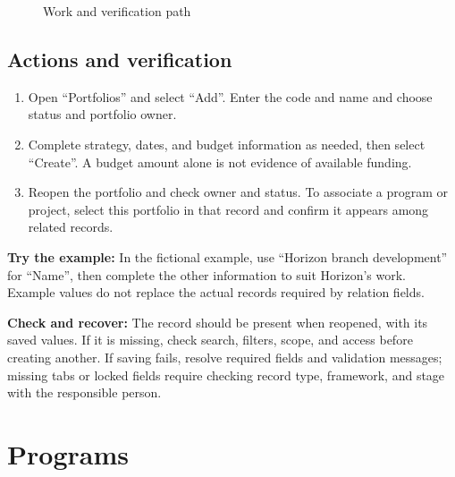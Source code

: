 \begin{figure}[H]
\centering
{}
\rclegend
\caption{Work and verification path}
\label{fig:projects-portfolios-flow}
\end{figure}

\subsection{Actions and verification}
\begin{enumerate}
\item Open “Portfolios” and select “Add”. Enter the code and name and choose status and portfolio owner.
\item Complete strategy, dates, and budget information as needed, then select “Create”. A budget amount alone is not evidence of available funding.
\item Reopen the portfolio and check owner and status. To associate a program or project, select this portfolio in that record and confirm it appears among related records.
\end{enumerate}

\textbf{Try the example:} In the fictional example, use “Horizon branch development” for “Name”, then complete the other information to suit Horizon's work. Example values do not replace the actual records required by relation fields.

\textbf{Check and recover:} The record should be present when reopened, with its saved values. If it is missing, check search, filters, scope, and access before creating another. If saving fails, resolve required fields and validation messages; missing tabs or locked fields require checking record type, framework, and stage with the responsible person.

\clearpage
\section{Programs}
\label{sec:projects-feature-programs}

